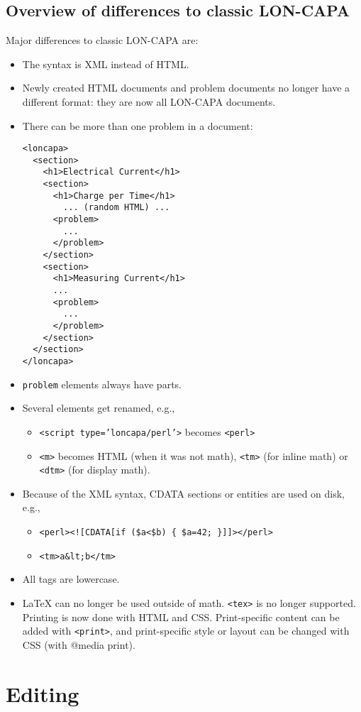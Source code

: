 \subsection{Overview of differences to classic LON-CAPA}
Major differences to classic LON-CAPA are:
\begin{itemize}
\item The syntax is XML instead of HTML.
\item Newly created HTML documents and problem documents no longer have a different format: they are now all LON-CAPA documents.
\item There can be more than one problem in a document:
\begin{verbatim}
<loncapa>
  <section>
    <h1>Electrical Current</h1>
    <section>
      <h1>Charge per Time</h1>
        ... (random HTML) ...
      <problem>
        ...
      </problem>
    </section>
    <section>
      <h1>Measuring Current</h1>
      ...
      <problem>
        ...
      </problem>
    </section>
  </section>
</loncapa>
\end{verbatim}
\item \texttt{problem} elements always have parts.
\item Several elements get renamed, e.g.,
\begin{itemize}
\item \texttt{<script type='loncapa/perl'>} becomes \texttt{<perl>}
\item \texttt{<m>} becomes HTML (when it was not math), \texttt{<tm>} (for inline math) or \texttt{<dtm>} (for display math).
\end{itemize}
\item Because of the XML syntax, CDATA sections or entities are used on disk, e.g.,
\begin{itemize}
\item \texttt{<perl><![CDATA[if (\$a<\$b) \{ \$a=42; \}]]></perl>}
\item \texttt{<tm>a\&lt;b</tm>}
\end{itemize}
\item All tags are lowercase.
\item LaTeX can no longer be used outside of math. \texttt{<tex>} is no longer supported. Printing is now done with HTML and CSS. Print-specific content can be added with \texttt{<print>}, and print-specific style or layout can be changed with CSS (with @media print).
\end{itemize}

\section{Editing}
